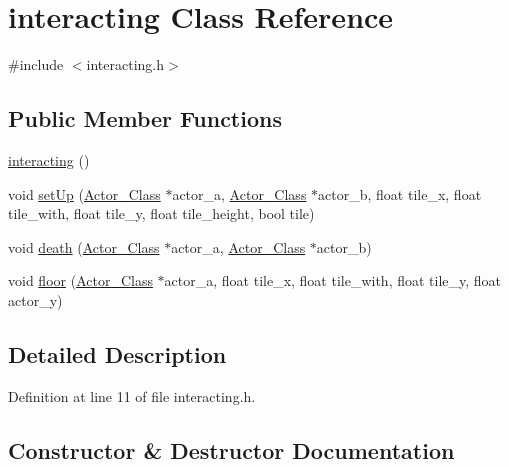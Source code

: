\hypertarget{classinteracting}{}\section{interacting Class Reference}
\label{classinteracting}


{\ttfamily \#include $<$interacting.\+h$>$}

\subsection*{Public Member Functions}
\begin{DoxyCompactItemize}
\item 
\hyperlink{classinteracting_ab185038d8281dba7c1a8b913fd8d6267}{interacting} ()
\item 
void \hyperlink{classinteracting_a1a20b43d3119675a5946efb630bf6202}{set\+Up} (\hyperlink{class_actor___class}{Actor\+\_\+\+Class} $\ast$actor\+\_\+a, \hyperlink{class_actor___class}{Actor\+\_\+\+Class} $\ast$actor\+\_\+b, float tile\+\_\+x, float tile\+\_\+with, float tile\+\_\+y, float tile\+\_\+height, bool tile)
\item 
void \hyperlink{classinteracting_a72962dcd137f0451ac1149e3ab2745c3}{death} (\hyperlink{class_actor___class}{Actor\+\_\+\+Class} $\ast$actor\+\_\+a, \hyperlink{class_actor___class}{Actor\+\_\+\+Class} $\ast$actor\+\_\+b)
\item 
void \hyperlink{classinteracting_a0b4bb6b7b2119c7e17ebc6717e66ff1f}{floor} (\hyperlink{class_actor___class}{Actor\+\_\+\+Class} $\ast$actor\+\_\+a, float tile\+\_\+x, float tile\+\_\+with, float tile\+\_\+y, float actor\+\_\+y)
\end{DoxyCompactItemize}


\subsection{Detailed Description}


Definition at line 11 of file interacting.\+h.



\subsection{Constructor \& Destructor Documentation}
\hypertarget{classinteracting_ab185038d8281dba7c1a8b913fd8d6267}{}\label{classinteracting_ab185038d8281dba7c1a8b913fd8d6267} 
